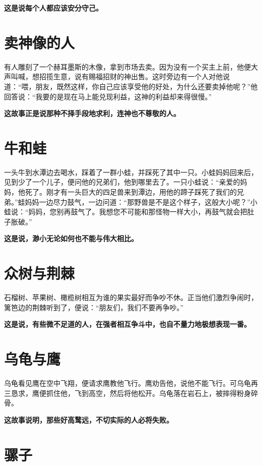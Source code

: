 {\bfseries \color{red}这是说每个人都应该安分守己。}

\section{卖神像的人}

有人雕刻了一个赫耳墨斯的木像，拿到市场去卖。因为没有一个买主上前，他便大声叫喊，想招揽生意，说有赐福招财的神出售。这时旁边有一个人对他说道：“喂，朋友，既然这样，你自己应该享受他的好处，为什么还要卖掉他呢？”他回答说：“我要的是现在马上能兑现利益，这神的利益却来得很慢。”

{\bfseries \color{red}这故事正是说那种不择手段地求利，连神也不尊敬的人。}

\section{牛和蛙}

一头牛到水潭边去喝水，踩着了一群小蛙，并踩死了其中一只。小蛙妈妈回来后，见到少了一个儿子，便问他的兄弟们，他到哪里去了。一只小蛙说：“亲爱的妈妈，他死了。刚才有一头巨大的四足兽来到潭边，用他的蹄子踩死了我们的兄弟。”蛙妈妈一边尽力鼓气，一边问道：“那野兽是不是这个样子，这般大小呢？”小蛙说：“妈妈，您别再鼓气了。我想您不可能和那怪物一样大小，再鼓气就会把肚子胀破。”

{\bfseries \color{red}这是说，渺小无论如何也不能与伟大相比。}

\section{众树与荆棘}

石榴树、苹果树、橄榄树相互为谁的果实最好而争吵不休。正当他们激烈争闹时，篱笆边的荆棘听到了，便说：“朋友们，我们不要再争吵。”

{\bfseries \color{red}这是说，有些微不足道的人，在强者相互争斗中，也自不量力地极想表现一番。}

\section{乌龟与鹰}

乌龟看见鹰在空中飞翔，便请求鹰教他飞行。鹰劝告他，说他不能飞行。可乌龟再三恳求，鹰便抓住他，飞到高空，然后将他松开。乌龟落在岩石上，被摔得粉身碎骨。

{\bfseries \color{red}这故事说明，那些好高鹜远，不切实际的人必将失败。}

\section{骡子}

